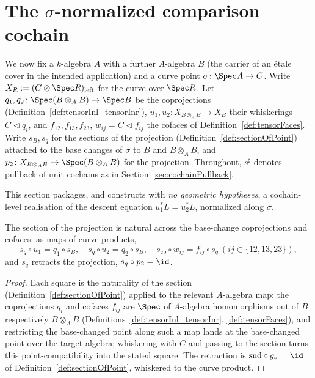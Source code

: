 \section{The \texorpdfstring{\(\sigma\)}{sigma}-normalized comparison cochain}
\label{sec:normalizedComparison}

We now fix a \(k\)-algebra \(A\) with a further \(A\)-algebra \(B\) (the carrier of an \'etale
cover in the intended application) and a curve point \(\sigma \colon \Spec A \to C\).
Write \(X_R := (C \otimes \Spec R)_{\mathrm{left}}\) for the curve over \(\Spec R\). Let
\(q_1, q_2 \colon \Spec(B \otimes_A B) \to \Spec B\) be the coprojections
(Definition~\ref{def:tensorInl_tensorInr}), \(u_1, u_2 \colon X_{B \otimes_A B} \to X_B\) their
whiskerings \(C \lhd q_i\), and \(f_{12}, f_{13}, f_{23}\), \(w_{ij} = C \lhd f_{ij}\) the cofaces
of Definition~\ref{def:tensorFaces}. Write \(s_B, s_q\) for the sections of the projection
(Definition~\ref{def:sectionOfPoint}) attached to the base changes of \(\sigma\) to \(B\) and
\(B \otimes_A B\), and \(p_2 \colon X_{B \otimes_A B} \to \Spec(B \otimes_A B)\) for the
projection. Throughout, \(s^{\sharp}\) denotes pullback of unit cochains as in
Section~\ref{sec:cochainPullback}.

This section packages, and constructs with \emph{no geometric hypotheses}, a cochain-level
realisation of the descent equation \(u_1^{*} L = u_2^{*} L\), normalized along \(\sigma\).

\begin{lemma}
  \label{lem:sectionSquares}
  \leanok
  The section of the projection is natural across the base-change coprojections and cofaces: as
  maps of curve products,
  \[
    s_q \circ u_1 = q_1 \circ s_B, \quad s_q \circ u_2 = q_2 \circ s_B, \quad
    s_{\mathrm{cb}} \circ w_{ij} = f_{ij} \circ s_q \ (ij \in \{12,13,23\}),
  \]
  and \(s_q\) retracts the projection, \(s_q \circ p_2 = \id\).
\end{lemma}
\begin{proof}
  \leanok
  Each square is the naturality of the section (Definition~\ref{def:sectionOfPoint}) applied to
  the relevant \(A\)-algebra map: the coprojections \(q_i\) and cofaces \(f_{ij}\) are
  \(\Spec\) of \(A\)-algebra homomorphisms out of \(B\) respectively \(B \otimes_A B\)
  (Definitions~\ref{def:tensorInl_tensorInr}, \ref{def:tensorFaces}), and restricting the
  base-changed point along such a map lands at the base-changed point over the target algebra;
  whiskering with \(C\) and passing to the section turns this point-compatibility into the stated
  square. The retraction is \(\mathrm{snd} \circ g_\sigma = \id\) of
  Definition~\ref{def:sectionOfPoint}, whiskered to the curve product.
\end{proof}

